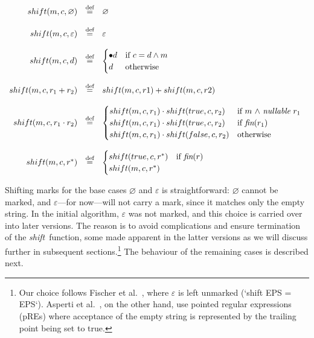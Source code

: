 \documentclass[12pt]{article}
\newcommand{\shift}{\textit{shift}}
\newcommand{\fin}{\textit{fin}}
\newcommand{\nullable}{\textit{nullable}}
\begin{document}
\[
\begin{array}{rcl}
  shift(m,c,\varnothing)              & \stackrel{\text{def}}{=} & \varnothing \\\\
  shift(m,c,\varepsilon)              & \stackrel{\text{def}}{=} & \varepsilon \\\\
  shift(m,c,d)              & \stackrel{\text{def}}{=} &
   \begin{cases}
    \bullet d & \text{if  \( c=d \land m \)}\\
    d         & \text{otherwise}\\
   \end{cases} \\\\

  shift(m,c, r_1 + r_2)     & \stackrel{\text{def}}{=} & shift(m,c,r1) + shift(m,c,r2) \\\\
  shift(m,c, r_1 \cdot r_2) & \stackrel{\text{def}}{=} &
    \begin{cases}
      shift(m,c,r_1) \cdot shift(true,c,r_2)  & \text{if $m$ $\land$ $\nullable$  $r_1$ } \\
      shift(m,c,r_1) \cdot shift(true,c,r_2)  & \text{if $\fin(r_1)$} \\
      shift(m,c,r_1) \cdot shift(false,c,r_2) & \text{otherwise}
    \end{cases} \\\\
  shift(m,c, r^*)           & \stackrel{\text{def}}{=} &
    \begin{cases}
      shift(true,c,r^*) & \text{if $\fin(r)$} \\
      shift(m,c,r^*)    &  \\
    \end{cases}
\end{array}
\]

\noindent
Shifting marks for the base cases $\varnothing$ and $\varepsilon$ is straightforward:  
$\varnothing$ cannot be marked, and $\varepsilon$---for now---will not carry a mark, since it matches only the empty string.  
In the initial algorithm, $\varepsilon$ was not marked, and this choice is carried over into later versions. The reason is to avoid complications and ensure termination of the \shift\ function, some made apparent in the latter versions as we will discuss further in subsequent sections.\footnote{Our choice follows Fischer et al.~\cite{Fischer2010}, where $\varepsilon$ is left unmarked (`shift EPS = EPS`). Asperti et al.~\cite{Asperti2010}, on the other hand, use pointed regular expressions (pREs) where acceptance of the empty string is represented by the trailing point being set to true.}  
The behaviour of the remaining cases is described next.
\end{document}

